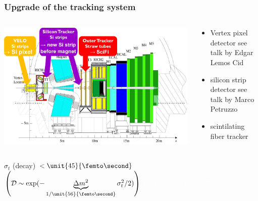 \documentclass[table,xcolor=dvipsnames,professionalfonts]{beamer}
\begin{document}
    \begin{frame}
      \frametitle{Upgrade of the tracking system}
      \begin{columns}
        \begin{column}{.6\textwidth}
          \includegraphics[width=\textwidth]{./LHCb2.pdf}
        \end{column}
        \begin{column}{.4\textwidth}
            \begin{itemize}
              \item Vertex pixel detector
                \newline see talk by Edgar Lemos Cid
              \item silicon strip detector
                \newline see talk by Marco Petruzzo
              \item scintilating fiber tracker
            \end{itemize}
          \end{column}
        \end{columns}
        \begin{columns}
        \begin{column}{.8\textwidth}
          \begin{block}{$\sigma_t$ (decay)}
            {\textcolor{white}{
            $<\unit{45}{\femto\second}$
            \newline $\left(\mathcal{D}\sim \exp(-\underbrace{\Delta m^2}_{1/\unit{56}{\femto\second}}\sigma_t^2/2)\right)$
            \newline for time dependent $B_s$ analyses
          }}
          \end{block}
          \end{column}
        \end{columns}
      \end{frame}
\end{document}
